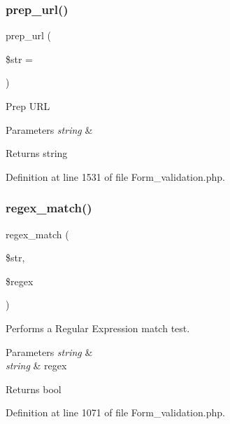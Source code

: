 \subsubsection{\texorpdfstring{prep\_url()}{prep\_url()}}
{\footnotesize\ttfamily prep\+\_\+url (\begin{DoxyParamCaption}\item[{}]{\$str = {\ttfamily \textquotesingle{}\textquotesingle{}} }\end{DoxyParamCaption})}

Prep U\+RL


\begin{DoxyParams}{Parameters}
{\em string} & \\
\hline
\end{DoxyParams}
\begin{DoxyReturn}{Returns}
string 
\end{DoxyReturn}


Definition at line 1531 of file Form\+\_\+validation.\+php.

\mbox{\label{class_c_i___form__validation_acef19e29276dbdd2c69dffd5ec635600}} 
\subsubsection{\texorpdfstring{regex\_match()}{regex\_match()}}
{\footnotesize\ttfamily regex\+\_\+match (\begin{DoxyParamCaption}\item[{}]{\$str,  }\item[{}]{\$regex }\end{DoxyParamCaption})}

Performs a Regular Expression match test.


\begin{DoxyParams}{Parameters}
{\em string} & \\
\hline
{\em string} & regex \\
\hline
\end{DoxyParams}
\begin{DoxyReturn}{Returns}
bool 
\end{DoxyReturn}


Definition at line 1071 of file Form\+\_\+validation.\+php.

\mbox{\label{class_c_i___form__validation_ada72eadfd041118d5f429a93dd0de07e}} 
